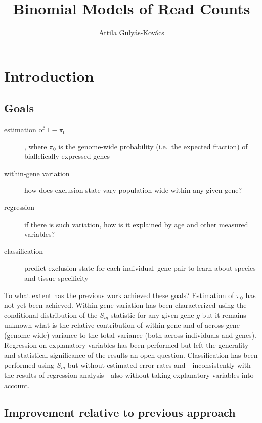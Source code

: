 \documentclass[letterpaper]{article}
\title{Binomial Models of Read Counts}
\author{Attila Gulyás-Kovács}
\begin{document}
\maketitle

\section{Introduction}

\subsection{Goals}

\begin{description}
\item[estimation of \(1-\pi_0\)], where \(\pi_0\) is the genome-wide probability
(i.e.~the expected fraction) of biallelically
expressed genes
\item[within-gene variation] how does exclusion state vary
population-wide within any given gene?
\item[regression] if there is such variation, how is it explained by age and
other measured variables?
\item[classification] predict exclusion state for each individual--gene pair
to learn about species and tissue specificity
\end{description}

To what extent has the previous work achieved these goals?  Estimation of
\(\pi_0\) has not yet been achieved.  Within-gene variation has been
characterized using the conditional distribution of the \(S_{ig}\) statistic
for any given gene \(g\) but it remains unknown what is the relative contribution of within-gene and of
across-gene (genome-wide) variance to the total variance (both across
individuals and genes).  Regression on explanatory variables has been performed but
left the generality and statistical significance of the results an open
question.  Classification has been performed using \(S_{ig}\) but without
estimated error rates and---inconsistently with the results of regression
analysis---also without taking explanatory variables into account.

\subsection{Improvement relative to previous approach}
\label{sec:improvement}
\end{document}

